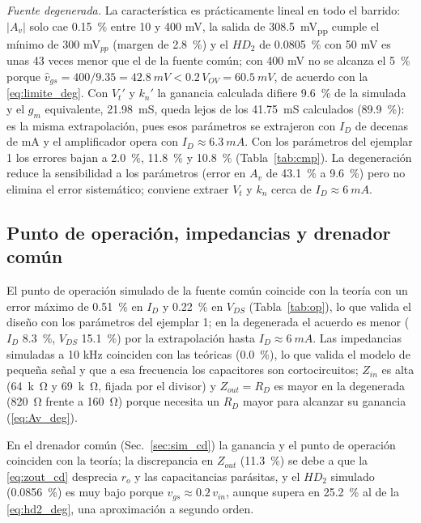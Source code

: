 \documentclass[conference]{IEEEtran}
\newcommand{\gm}{g_m}
\newcommand{\kn}{k_n}
\newcommand{\Vov}{V_{OV}}
\newcommand{\Vtp}{V_t'}
\newcommand{\knp}{k_n'}
\begin{document}
\textit{Fuente degenerada.} La característica es prácticamente lineal en todo el barrido: $|A_v|$ solo cae \SI{0.15}{\percent} entre 10 y 400 mV, la salida de \SI{308.5}{mV_{pp}} cumple el mínimo de 300 mV$_{pp}$ (margen de \SI{2.8}{\percent}) y el $HD_2$ de \SI{0.0805}{\percent} con 50 mV es unas 43 veces menor que el de la fuente común; con 400 mV no se alcanza el \SI{5}{\percent} porque $\hat v_{gs}=400/9.35=\SI{42.8}{mV}<0.2\,\Vov=\SI{60.5}{mV}$, de acuerdo con la \eqref{eq:limite_deg}. Con $\Vtp$ y $\knp$ la ganancia calculada difiere \SI{9.6}{\percent} de la simulada y el $\gm$ equivalente, \SI{21.98}{mS}, queda lejos de los \SI{41.75}{mS} calculados (\SI{89.9}{\percent}): es la misma extrapolación, pues esos parámetros se extrajeron con $I_D$ de decenas de mA y el amplificador opera con $I_D\approx\SI{6.3}{mA}$. Con los parámetros del ejemplar 1 los errores bajan a \SI{2.0}{\percent}, \SI{11.8}{\percent} y \SI{10.8}{\percent} (Tabla~\ref{tab:cmp}). La degeneración reduce la sensibilidad a los parámetros (error en $A_v$ de \SI{43.1}{\percent} a \SI{9.6}{\percent}) pero no elimina el error sistemático; conviene extraer $V_t$ y $\kn$ cerca de $I_D\approx\SI{6}{mA}$.

\subsection{Punto de operación, impedancias y drenador común}
\label{sec:an_op_zin}
El punto de operación simulado de la fuente común coincide con la teoría con un error máximo de \SI{0.51}{\percent} en $I_D$ y \SI{0.22}{\percent} en $V_{DS}$ (Tabla~\ref{tab:op}), lo que valida el diseño con los parámetros del ejemplar 1; en la degenerada el acuerdo es menor ($I_D$ \SI{8.3}{\percent}, $V_{DS}$ \SI{15.1}{\percent}) por la extrapolación hasta $I_D\approx\SI{6}{mA}$. Las impedancias simuladas a 10 kHz coinciden con las teóricas (\SI{0.0}{\percent}), lo que valida el modelo de pequeña señal y que a esa frecuencia los capacitores son cortocircuitos; $Z_{in}$ es alta (\SI{64}{k\ohm} y \SI{69}{k\ohm}, fijada por el divisor) y $Z_{out}=R_D$ es mayor en la degenerada (\SI{820}{\ohm} frente a \SI{160}{\ohm}) porque necesita un $R_D$ mayor para alcanzar su ganancia (\eqref{eq:Av_deg}).

En el drenador común (Sec.~\ref{sec:sim_cd}) la ganancia y el punto de operación coinciden con la teoría; la discrepancia en $Z_{out}$ (\SI{11.3}{\percent}) se debe a que la \eqref{eq:zout_cd} desprecia $r_o$ y las capacitancias parásitas, y el $HD_2$ simulado (\SI{0.0856}{\percent}) es muy bajo porque $v_{gs}\approx0.2\,v_{in}$, aunque supera en \SI{25.2}{\percent} al de la \eqref{eq:hd2_deg}, una aproximación a segundo orden.
\end{document}
